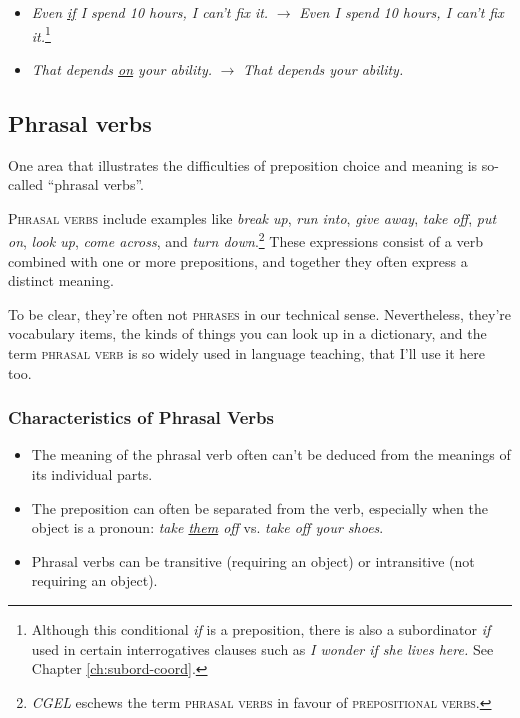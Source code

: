 \begin{itemize}
    \item   \textit{Even \uline{if} I spend 10 hours, I can't fix it.} $\rightarrow$ \textit{Even I spend 10 hours, I can't fix it.}\footnote{Although this conditional  \textit{if} is a preposition, there is also a subordinator \textit{if} used in certain interrogatives clauses such as \textit{I wonder if she lives here.} See Chapter \ref{ch:subord-coord}.}
    \item \textit{That depends \uline{on} your ability.} $\rightarrow$ \textit{That depends your ability.}
\end{itemize}

\subsection{Phrasal verbs}\label{ssec:phrasal-verbs}

One area that illustrates the difficulties of preposition choice and meaning is so-called ``phrasal verbs''.

\textsc{Phrasal verbs} include examples like \textit{break up}, \textit{run into}, \textit{give away}, \textit{take off},
\textit{put on}, \textit{look up}, \textit{come across}, and \textit{turn down}.\footnote{\textit{CGEL} \citep{Huddleston2002} eschews the term \textsc{phrasal verbs} in favour of \textsc{prepositional verbs}.} These expressions consist of a verb
combined with one or more prepositions, and together they often express a distinct meaning.

To be clear, they're often not \textsc{phrases} in our technical sense. Nevertheless,
they're vocabulary items, the kinds of things you can look up in a dictionary,
and the term \textsc{phrasal verb} is so widely used in language teaching, that I'll use
it here too.

\subsubsection*{Characteristics of Phrasal Verbs}

\begin{itemize}
    \item The meaning of the phrasal verb often can't be deduced from the meanings
    of its individual parts.
    \item The preposition can often be separated from the verb, especially when the
    object is a pronoun: \textit{take \uline{them} off} vs. \textit{take off your shoes}.
    \item Phrasal verbs can be transitive (requiring an object) or intransitive (not
    requiring an object).
\end{itemize}

